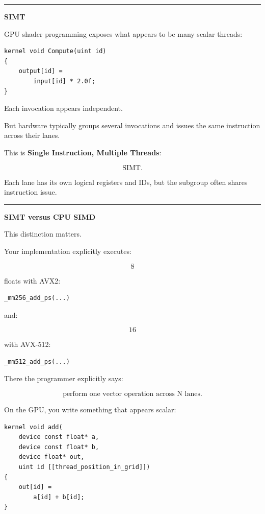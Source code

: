 \begin{center}\rule{0.5\linewidth}{0.5pt}\end{center}

\textbf{SIMT}

GPU shader programming exposes what appears to be many scalar threads:

\protect{}\label{e937zu}%
\begin{verbatim}
kernel void Compute(uint id)
{
    output[id] =
        input[id] * 2.0f;
}
\end{verbatim}

Each invocation appears independent.

But hardware typically groups several invocations and issues the same instruction across their lanes.

This is \textbf{Single Instruction, Multiple Threads}:

\[
\boxed{\text{SIMT}.}
\]

Each lane has its own logical registers and IDs, but the subgroup often shares instruction issue.

\begin{center}\rule{0.5\linewidth}{0.5pt}\end{center}

\textbf{SIMT versus CPU SIMD}

This distinction matters.

Your  implementation explicitly executes:

\[
8
\]

floats with AVX2:

\protect{}\label{qpohrx}%
\begin{verbatim}
_mm256_add_ps(...)
\end{verbatim}

and:

\[
16
\]

with AVX-512:

\protect{}\label{6vk2sf}%
\begin{verbatim}
_mm512_add_ps(...)
\end{verbatim}

There the programmer explicitly says:

\[
\boxed{\text{perform one vector operation across N lanes}.}
\]

On the GPU, you write something that appears scalar:

\protect{}\label{2o38s4}%
\begin{verbatim}
kernel void add(
    device const float* a,
    device const float* b,
    device float* out,
    uint id [[thread_position_in_grid]])
{
    out[id] =
        a[id] + b[id];
}
\end{verbatim}

